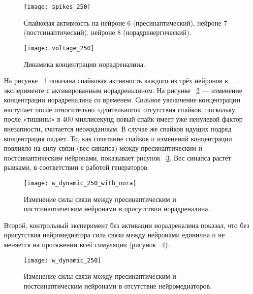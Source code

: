 \begin{figure}
	\centering
	\texttt{[image: spikes\_250]}
	\caption{Спайковая активность на нейроне 6 (пресинаптический), нейроне 7 (постсинаптический), нейроне 8 (норадренергический).}
	\label{fig:spikes_250}
\end{figure}


\begin{figure}
	\centering
	\texttt{[image: voltage\_250]}
	\caption{Динамика концентрации норадреналина.}
	\label{fig:voltage_250}
\end{figure}


На рисунке ~\ref{fig:spikes_250} показана спайковая активность каждого из трёх нейронов в эксперименте с активированным норадреналином. На рисунке ~\ref{fig:voltage_250} — изменение концентрации норадреналина со временем. Сильное увеличение концентрации наступает после относительно «длительного» отсутствия спайков, поскольку после «тишины» в 400 миллисекунд новый спайк имеет уже ненулевой фактор внезапности, считается неожиданным. В случае же спайков идущих подряд концентрация падает. То, как сочетание спайков и изменений концентрации повлияло на силу связи (вес синапса) между пресинаптическим и постсинаптическим нейронами, показывает рисунок ~\ref{fig:w_dynamic_250_with_nora}. Вес синапса растёт рывками, в соответствии с работой генераторов.

\begin{figure}
	\centering
	\texttt{[image: w\_dynamic\_250\_with\_nora]}
	\caption{Изменение силы связи между пресинаптическим и постсинаптическим нейронами в присутствии норадреналина.}
	\label{fig:w_dynamic_250_with_nora}
\end{figure}

Второй, контрольный эксперимент без активации норадреналина показал, что без присутствия нейромедиатора сила связи между нейронами единична и не меняется на протяжении всей симуляции (рисунок ~\ref{fig:w_dynamic_250}).

\begin{figure}
	\centering
	\texttt{[image: w\_dynamic\_250]}
	\caption{Изменение силы связи между пресинаптическим и постсинаптическим нейронами в отсутствие нейромедиаторов.}
	\label{fig:w_dynamic_250}
\end{figure}